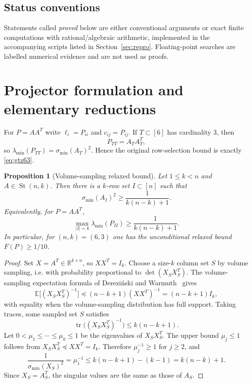 \documentclass[11pt]{article}
\numberwithin{equation}{section}
\newtheorem{proposition}[theorem]{Proposition}
\theoremstyle{definition}
\newcommand{\R}{\mathbb{R}}
\newcommand{\St}{\operatorname{St}}
\newcommand{\tr}{\operatorname{tr}}
\newcommand{\smin}{\sigma_{\min}}
\begin{document}
\subsection*{Status conventions}

Statements called \emph{proved} below are either conventional arguments or exact
finite computations with rational/algebraic arithmetic, implemented in the
accompanying scripts listed in Section~\ref{sec:repro}.  Floating-point searches
are labelled numerical evidence and are not used as proofs.

\section{Projector formulation and elementary reductions}

For $P=AA^T$ write $\ell_i=P_{ii}$ and $c_{ij}=P_{ij}$.  If $T\subset[6]$ has
cardinality $3$, then
\[
  P_{TT}=A_TA_T^T,
\]
so $\lambda_{\min}(P_{TT})=\smin(A_T)^2$.  Hence the original row-selection
bound is exactly \eqref{eq:gtz63}.

\begin{proposition}[Volume-sampling relaxed bound]\label{prop:volume-relaxed}
Let $1\le k<n$ and $A\in\St(n,k)$.  Then there is a $k$-row set
$I\subset[n]$ such that
\[
  \sigma_{\min}(A_I)^2\ge \frac{1}{k(n-k)+1}.
\]
Equivalently, for $P=AA^T$,
\[
  \max_{|I|=k}\lambda_{\min}(P_{II})\ge \frac{1}{k(n-k)+1}.
\]
In particular, for $(n,k)=(6,3)$ one has the unconditional relaxed bound
$F(P)\ge 1/10$.
\end{proposition}

\begin{proof}
Set $X=A^T\in\R^{k\times n}$, so $XX^T=I_k$.  Choose a size-$k$ column set
$S$ by volume sampling, i.e. with probability proportional to
$\det(X_SX_S^T)$.  The volume-sampling expectation formula of
Derezi\'nski and Warmuth~\cite[Theorem 4]{DerezinskiWarmuth} gives
\[
  \mathbb E\bigl[(X_SX_S^T)^{-1}\bigr]\preceq (n-k+1)(XX^T)^{-1}
  =(n-k+1)I_k,
\]
with equality when the volume-sampling distribution has full support.  Taking
traces, some sampled set $S$ satisfies
\[
  \tr\bigl((X_SX_S^T)^{-1}\bigr)\le k(n-k+1).
\]
Let $0<\mu_1\le\cdots\le\mu_k\le1$ be the eigenvalues of $X_SX_S^T$.
The upper bound $\mu_j\le1$ follows from $X_SX_S^T\preceq XX^T=I_k$.
Therefore $\mu_j^{-1}\ge1$ for $j\ge2$, and
\[
  \frac{1}{\sigma_{\min}(X_S)^2}
  =\mu_1^{-1}
  \le k(n-k+1)-(k-1)
  =k(n-k)+1.
\]
Since $X_S=A_S^T$, the singular values are the same as those of $A_S$.
\end{proof}
\end{document}

